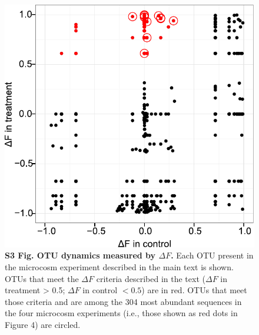 \clearpage
\begin{figure}[ht]
\centering
\includegraphics{texmex/fig/fig_s3}
\caption*{{\bf S3 Fig. OTU dynamics measured by $\Delta F$.}
Each OTU present in the microcosm experiment described in the main text is
shown. OTUs that meet the $\Delta F$ criteria described in the text ($\Delta F$ in treatment >
0.5; $\Delta F$ in control $< 0.5$) are in red. OTUs that meet those criteria and are
among the 304 most abundant sequences in the four microcosm experiments (i.e.,
those shown as red dots in Figure 4) are circled.}
\end{figure}
